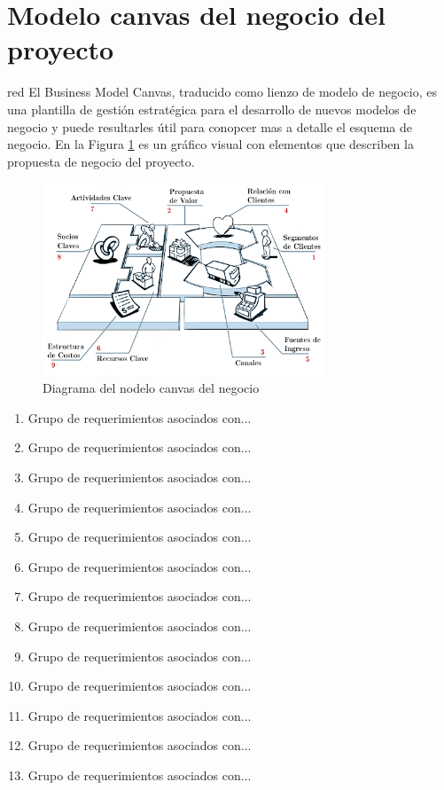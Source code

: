 \documentclass[11pt]{charter}
\begin{document}
\section{Modelo canvas del negocio del proyecto}
\begin{consigna}{red}
El Business Model Canvas, traducido como lienzo de modelo de negocio, es una plantilla de gestión estratégica para el desarrollo de nuevos modelos de negocio y puede resultarles útil para conopcer mas a detalle el esquema de negocio. En la Figura \ref{fig:diagCanvas}
es un gráfico visual con elementos que describen la propuesta de negocio del proyecto.
\vspace{25px}

\begin{figure}[htpb]
\centering 
\includegraphics[width=0.75\textwidth]{./Figuras/diagCanvas.png}
\caption{Diagrama del nodelo canvas del negocio}
\label{fig:diagCanvas}
\end{figure}

\begin{enumerate}
\item Grupo de requerimientos asociados con...
\item Grupo de requerimientos asociados con...
\item Grupo de requerimientos asociados con...
\item Grupo de requerimientos asociados con...
\item Grupo de requerimientos asociados con...
\item Grupo de requerimientos asociados con...
\item Grupo de requerimientos asociados con...
\item Grupo de requerimientos asociados con...
\item Grupo de requerimientos asociados con...
\item Grupo de requerimientos asociados con...
\item Grupo de requerimientos asociados con...
\item Grupo de requerimientos asociados con...
\item Grupo de requerimientos asociados con...
\end{enumerate}
\end{consigna}
\end{document}
